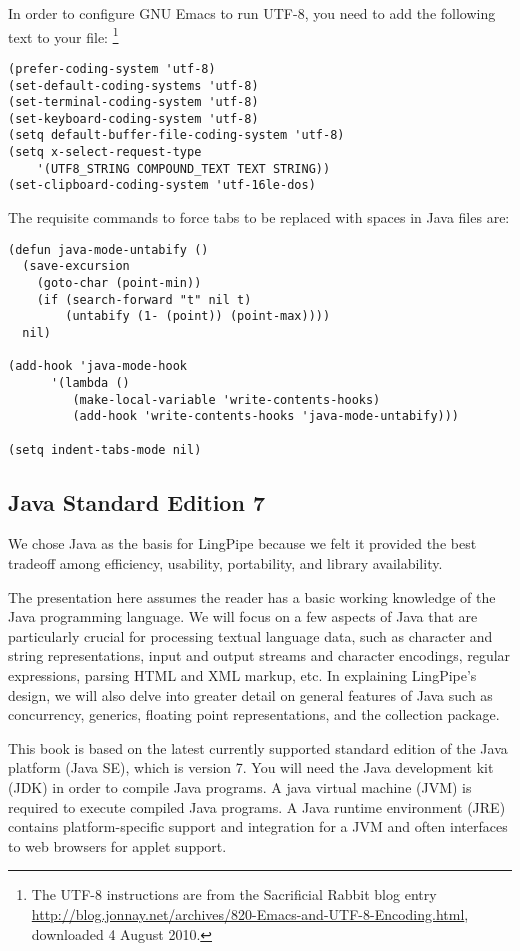 In order to configure GNU Emacs to run UTF-8, you need to add
the following text to your  file:%
%
\footnote{The UTF-8 instructions are from the Sacrificial Rabbit blog entry
  \url{http://blog.jonnay.net/archives/820-Emacs-and-UTF-8-Encoding.html},
  downloaded 4 August 2010.}
%
\begin{verbatim}
(prefer-coding-system 'utf-8)
(set-default-coding-systems 'utf-8)
(set-terminal-coding-system 'utf-8)
(set-keyboard-coding-system 'utf-8)
(setq default-buffer-file-coding-system 'utf-8)
(setq x-select-request-type 
    '(UTF8_STRING COMPOUND_TEXT TEXT STRING))
(set-clipboard-coding-system 'utf-16le-dos)
\end{verbatim}
%
The requisite commands to force tabs to be replaced with spaces in
Java files are: 
%
\begin{verbatim}
(defun java-mode-untabify ()
  (save-excursion
    (goto-char (point-min))
    (if (search-forward "t" nil t)
        (untabify (1- (point)) (point-max))))
  nil)

(add-hook 'java-mode-hook
      '(lambda ()
         (make-local-variable 'write-contents-hooks)
         (add-hook 'write-contents-hooks 'java-mode-untabify)))

(setq indent-tabs-mode nil)
\end{verbatim}

\subsection{Java Standard Edition 7}

We chose Java as the basis for LingPipe because we felt it
provided the best tradeoff among efficiency, usability, portability,
and library availability.

The presentation here assumes the reader has a basic working knowledge
of the Java programming language.  We will focus on a few aspects of
Java that are particularly crucial for processing textual language
data, such as character and string representations, input and output
streams and character encodings, regular expressions, parsing HTML and
XML markup, etc.  In explaining LingPipe's design, we will also delve
into greater detail on general features of Java such as concurrency,
generics, floating point representations, and the collection package.

This book is based on the latest currently supported standard edition
of the Java platform (Java SE), which is version 7.  You will need the
Java development kit (JDK) in order to compile Java programs.  A java
virtual machine (JVM) is required to execute compiled Java programs.
A Java runtime environment (JRE) contains platform-specific support
and integration for a JVM and often interfaces to web browsers for
applet support.

